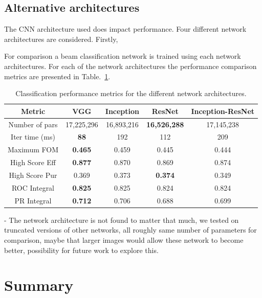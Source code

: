 \subsection*{Alternative architectures} %

The CNN architecture used does impact performance. Four different network architectures are
considered. Firstly,

For comparison a beam classification network is trained using each network architectures. For each
of the network architectures the performance comparison metrics are presented in
Table.~\ref{tab:sample}.

\begin{table}
    \begin{tabular}{ccccc}
        Metric         & VGG            & Inception  & ResNet              & Inception-ResNet \\
        \midrule
        Number of pars & 17,225,296     & 16,893,216 & \textbf{16,526,288} & 17,145,238       \\
        Iter time (ms) & \textbf{88}    & 192        & 112                 & 209              \\
        Maximum FOM    & \textbf{0.465} & 0.459      & 0.445               & 0.444            \\
        High Score Eff & \textbf{0.877} & 0.870      & 0.869               & 0.874            \\
        High Score Pur & 0.369          & 0.373      & \textbf{0.374}      & 0.349            \\
        ROC Integral   & \textbf{0.825} & 0.825      & 0.824               & 0.824            \\
        PR Integral    & \textbf{0.712} & 0.706      & 0.688               & 0.699            \\
    \end{tabular}
    \caption[Classification performance metrics for different network architectures]
    {Classification performance metrics for the different network architectures.}
    \label{tab:sample}
\end{table}

- The network architecture is not found to matter that much, we tested on truncated versions of
other networks, all roughly same number of parameters for comparison, maybe that larger images
would allow these network to become better, possibility for future work to explore this.

\section{Summary} %
\label{sec:results_summary} %

